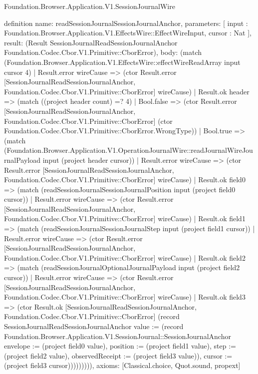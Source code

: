 \begin{lexlean}{Foundation.Browser.Application.V1.SessionJournalWire}
\begin{semanticmodule}
definition{
  name: readSessionJournalSessionJournalAnchor,
  parameters: [
    input : Foundation.Browser.Application.V1.EffectsWire::EffectWireInput,
    cursor : Nat
  ],
  result: (Result SessionJournalReadSessionJournalAnchor Foundation.Codec.Cbor.V1.Primitive::CborError),
  body: (match (Foundation.Browser.Application.V1.EffectsWire::effectWireReadArray input cursor 4)
    | Result.error wireCause => (ctor Result.error [SessionJournalReadSessionJournalAnchor, Foundation.Codec.Cbor.V1.Primitive::CborError] wireCause)
    | Result.ok header => (match ((project header count) =? 4)
      | Bool.false => (ctor Result.error [SessionJournalReadSessionJournalAnchor, Foundation.Codec.Cbor.V1.Primitive::CborError] (ctor Foundation.Codec.Cbor.V1.Primitive::CborError.WrongType))
      | Bool.true => (match (Foundation.Browser.Application.V1.OperationJournalWire::readJournalWireJournalPayload input (project header cursor))
        | Result.error wireCause => (ctor Result.error [SessionJournalReadSessionJournalAnchor, Foundation.Codec.Cbor.V1.Primitive::CborError] wireCause)
        | Result.ok field0 => (match (readSessionJournalSessionJournalPosition input (project field0 cursor))
          | Result.error wireCause => (ctor Result.error [SessionJournalReadSessionJournalAnchor, Foundation.Codec.Cbor.V1.Primitive::CborError] wireCause)
          | Result.ok field1 => (match (readSessionJournalSessionJournalStep input (project field1 cursor))
            | Result.error wireCause => (ctor Result.error [SessionJournalReadSessionJournalAnchor, Foundation.Codec.Cbor.V1.Primitive::CborError] wireCause)
            | Result.ok field2 => (match (readSessionJournalOptionalJournalPayload input (project field2 cursor))
              | Result.error wireCause => (ctor Result.error [SessionJournalReadSessionJournalAnchor, Foundation.Codec.Cbor.V1.Primitive::CborError] wireCause)
              | Result.ok field3 => (ctor Result.ok [SessionJournalReadSessionJournalAnchor, Foundation.Codec.Cbor.V1.Primitive::CborError] (record SessionJournalReadSessionJournalAnchor {value := (record Foundation.Browser.Application.V1.SessionJournal::SessionJournalAnchor {envelope := (project field0 value), position := (project field1 value), step := (project field2 value), observedReceipt := (project field3 value)}), cursor := (project field3 cursor)})))))))),
  axioms: [Classical.choice, Quot.sound, propext]
}


\end{semanticmodule}
\end{lexlean}
